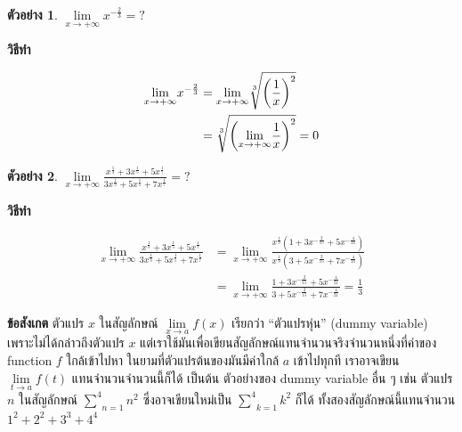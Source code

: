 \documentclass[
]{book}
\theoremstyle{definition}
\theoremstyle{definition}
\newtheorem{example}{ตัวอย่าง}[chapter]
\theoremstyle{definition}
\theoremstyle{definition}
\theoremstyle{remark}
\begin{document}
\begin{example}
\protect\hypertarget{exm:ex-limit-8}{}\label{exm:ex-limit-8}\(\underset{x\rightarrow +\infty }{\lim}x^{-\frac{2}{3}}=?\)
\end{example}

\textbf{วิธีทำ}

\begin{equation}
  \begin{aligned}
    \underset{x\rightarrow +\infty }{\lim}x^{-\frac{2}{3}}
        &=\underset{x\rightarrow +\infty }{\lim}\root{3}\of{\left( \frac{1}{x}\right) ^{2}} \\
        &=\root{3}\of{\left( \underset{x\rightarrow +\infty }{\lim}\frac{1}{x}\right) ^{2}}
            =0
  \end{aligned}
\end{equation}

\begin{example}
\protect\hypertarget{exm:ex-limit-9}{}\label{exm:ex-limit-9}\(\underset{x\rightarrow +\infty }{\lim}\frac{x^{\frac{1}{3}}+3x^{\frac{1}{5}}+5x^{\frac{1}{7}}}{3x^{\frac{1}{3}}+5x^{\frac{1}{5}}+7x^{\frac{1}{7}}}=?\)
\end{example}

\textbf{วิธีทำ}

\begin{equation}
  \begin{aligned}
    \underset{x\rightarrow +\infty }{\lim}\frac{x^{\frac{1}{3}}+3x^{\frac{1}{5}}+5x^{\frac{1}{7}}}{3x^{\frac{1}{3}}+5x^{\frac{1}{5}}+7x^{\frac{1}{7}}}
        &=\underset{x\rightarrow +\infty }{\lim}\frac{x^{\frac{1}{3}}\left( 1+3x^{-\frac{2}{15}}+5x^{-\frac{4}{21}}\right) }{x^{\frac{1}{3}}\left( 3+5x^{-\frac{2}{15}}+7x^{-\frac{4}{21}}\right) } \\
        &=\underset{x\rightarrow +\infty }{\lim}\frac{1+3x^{-\frac{2}{15}}+5x^{-\frac{4}{21}}}{3+5x^{-\frac{2}{15}}+7x^{-\frac{4}{21}}}
=\frac{1}{3}
  \end{aligned}
\end{equation}

\textbf{ข้อสังเกต} ตัวแปร \(x\) ในสัญลักษณ์
\(\underset{x\rightarrow a}{\lim}f\left( x\right)\) เรียกว่า ``ตัวแปรหุ่น''
(dummy variable) เพราะไม่ได้กล่าวถึงตัวแปร \(x\)
แต่เราใช้มันเพื่อเขียนสัญลักษณ์แทนจำนวนจริงจำนวนหนึ่งที่ค่าของ function \(f\) ใกล้เข้าไปหา
ในยามที่ตัวแปรต้นของมันมีค่าใกล้ \(a\) เข้าไปทุกที เราอาจเขียน
\(\underset{t\rightarrow a}{\lim}f\left( t\right)\) แทนจำนวนจำนวนนี้ก็ได้
เป็นต้น ตัวอย่างของ dummy variable อื่น ๆ เช่น ตัวแปร \(n\) ในสัญลักษณ์
\(\underset{n=1}{\overset{4}{\sum }}n^{2}\) ซึ่งอาจเขียนใหม่เป็น
\(\underset{k=1}{\overset{4}{\sum }}k^{2}\) ก็ได้ ทั้งสองสัญลักษณ์นี้แทนจำนวน
\(1^{2}+2^{2}+3^{3}+4^{4}\)
\end{document}
